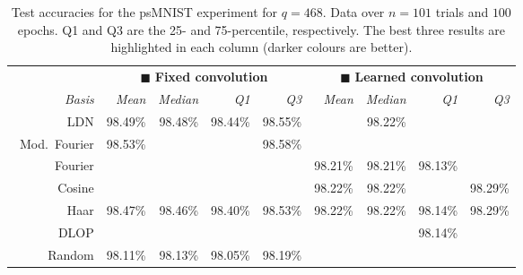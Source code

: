 \begin{table}
	\caption[Test accuracies for the psMNIST experiment]{Test accuracies for the psMNIST experiment for $q = 468$. Data over $n = 101$ trials and $100$ epochs. Q1 and Q3 are the 25- and 75-percentile, respectively. The best three results are highlighted in each column (darker colours are better).}
	\label{tbl:psmnist_results}
	\centering\small\sffamily
	\setlength{\tabcolsep}{7.25pt}
	\begin{tabular}{r  r r r r  r r r r}
	\toprule
	& \multicolumn{4}{c}{{\color{skyblue1}$\blacksquare$} \textbf{Fixed convolution}}
	& \multicolumn{4}{c}{{\color{aluminium2}$\blacksquare$} \textbf{Learned convolution}} \\
	\cmidrule(r){2-5}\cmidrule(l){6-9}
	\emph{Basis} &
	\emph{Mean} &
	\emph{Median} &
	\emph{Q1} &
	\emph{Q3} &
	\emph{Mean} &
	\emph{Median} &
	\emph{Q1} &
	\emph{Q3} \\
	\midrule
		\symLTI~LDN &
			98.49\% &
			98.48\% &
			98.44\% &
			98.55\% &
			 \cellcolor{CornflowerBlue!25}{98.23\%} &
			98.22\% &
			 \cellcolor{CornflowerBlue!25}{98.16\%} &
			 \cellcolor{CornflowerBlue!25}{98.30\%} \\
			\symLTI~Mod.~Fourier &
			98.53\% &
			 \cellcolor{CornflowerBlue!50}{98.54\%} &
			 \cellcolor{CornflowerBlue!25}{98.48\%} &
			98.58\% &
			 \cellcolor{CornflowerBlue!75}{98.24\%} &
			 \cellcolor{CornflowerBlue!50}{98.24\%} &
			 \cellcolor{CornflowerBlue!75}{98.18\%} &
			 \cellcolor{CornflowerBlue!50}{98.31\%} \\
			\symSDT~Fourier &
			 \cellcolor{CornflowerBlue!75}{98.56\%} &
			 \cellcolor{CornflowerBlue!75}{98.56\%} &
			 \cellcolor{CornflowerBlue!75}{98.51\%} &
			 \cellcolor{CornflowerBlue!75}{98.62\%} &
			98.21\% &
			98.21\% &
			98.13\% &
			 \cellcolor{CornflowerBlue!25}{98.30\%} \\
			\symSDT~Cosine &
			 \cellcolor{CornflowerBlue!50}{98.54\%} &
			 \cellcolor{CornflowerBlue!50}{98.54\%} &
			 \cellcolor{CornflowerBlue!50}{98.49\%} &
			 \cellcolor{CornflowerBlue!50}{98.60\%} &
			98.22\% &
			98.22\% &
			 \cellcolor{CornflowerBlue!25}{98.16\%} &
			98.29\% \\
			\symSDT~Haar &
			98.47\% &
			98.46\% &
			98.40\% &
			98.53\% &
			98.22\% &
			98.22\% &
			98.14\% &
			98.29\% \\
			\symFIR~DLOP &
			 \cellcolor{CornflowerBlue!50}{98.54\%} &
			 \cellcolor{CornflowerBlue!50}{98.54\%} &
			 \cellcolor{CornflowerBlue!25}{98.48\%} &
			 \cellcolor{CornflowerBlue!50}{98.60\%} &
			 \cellcolor{CornflowerBlue!25}{98.23\%} &
			 \cellcolor{CornflowerBlue!25}{98.23\%} &
			98.14\% &
			 \cellcolor{CornflowerBlue!25}{98.30\%} \\
			\symFIR~Random &
			98.11\% &
			98.13\% &
			98.05\% &
			98.19\% &
			 \cellcolor{CornflowerBlue!75}{98.24\%} &
			 \cellcolor{CornflowerBlue!75}{98.25\%} &
			 \cellcolor{CornflowerBlue!50}{98.17\%} &
			 \cellcolor{CornflowerBlue!75}{98.32\%} \\
	\bottomrule
	\end{tabular}
\end{table}

